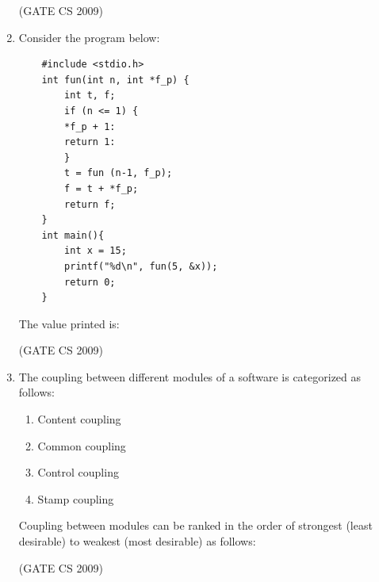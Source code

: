 \documentclass[a4paper, 11pt]{article}
\begin{document}
\begin{enumerate}
    \hfill (GATE CS 2009)

    \item Consider the program below:
    \begin{lstlisting}
    #include <stdio.h>
    int fun(int n, int *f_p) {
        int t, f;
        if (n <= 1) {
        *f_p + 1:
        return 1:
        }
        t = fun (n-1, f_p);
        f = t + *f_p;
        return f;
    }
    int main(){
        int x = 15;
        printf("%d\n", fun(5, &x));
        return 0;
    }
    \end{lstlisting}
    The value printed is: 
    \begin{enumerate}
    \end{enumerate}

    \hfill (GATE CS 2009)

    \item The coupling between different modules of a software is categorized as follows:
    \begin{enumerate}[label=\Roman*]
        \item Content coupling
        \item Common coupling 
        \item Control coupling
        \item Stamp coupling
    \end{enumerate}
    Coupling between modules can be ranked in the order of strongest (least desirable) to weakest (most desirable) as follows:
    \begin{enumerate}
    \end{enumerate}

    \hfill (GATE CS 2009)


\end{enumerate}
\end{document}
